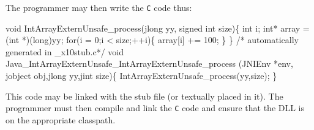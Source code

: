 The programmer may then write the {\tt C} code thus:
\begin{x10}
void IntArrayExternUnsafe\_process(jlong yy, 
                                signed int size)\{
  int i;
  int* array = (int *)(long)yy;
  for(i = 0;i < size;++i)\{
    array[i] += 100;
  \}
\}
/* automatically generated in \_x10stub.c*/
void 
 Java\_IntArrayExternUnsafe\_IntArrayExternUnsafe\_process
 (JNIEnv *env,  jobject obj,jlong yy,jint size)\{
   IntArrayExternUnsafe\_process(yy,size);
\}
\end{x10}

This code may be linked with the stub file (or textually placed in
it). The programmer must then compile and link the {\tt C} code and
ensure that the DLL is on the appropriate classpath. 

